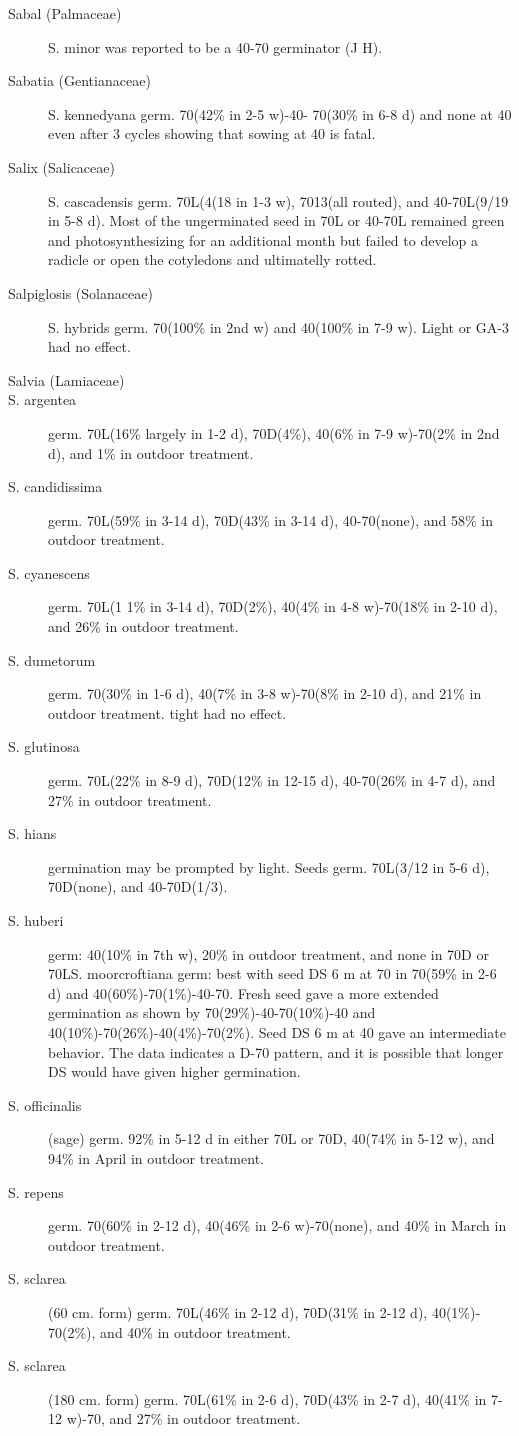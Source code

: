 \begin{description}
\item[Sabal (Palmaceae)] S. minor was reported to be a 40-70 germinator (J H).
\item[Sabatia (Gentianaceae)] S. kennedyana germ. 70(42\% in 2-5 w)-40-
70(30\% in 6-8 d) and none at 40 even after 3 cycles showing that sowing at 40 is fatal.
\item[Salix (Salicaceae)] S. cascadensis germ. 70L(4(18 in 1-3 w), 7013(all
routed), and 40-70L(9/19 in 5-8 d). Most of the ungerminated seed in 70L or 40-70L
remained green and photosynthesizing for an additional month but failed to develop a
radicle or open the cotyledons and ultimatelly rotted.
\item[Salpiglosis (Solanaceae)] S. hybrids germ. 70(100\% in 2nd w) and
40(100\% in 7-9 w). Light or GA-3 had no effect.

\item[Salvia (Lamiaceae)]
\item[S. argentea] germ. 70L(16\% largely in 1-2 d), 70D(4\%), 40(6\% in 7-9 w)-70(2\%
in 2nd d), and 1\% in outdoor treatment.
\item[S. candidissima] germ. 70L(59\% in 3-14 d), 70D(43\% in 3-14 d), 40-70(none),
and 58\% in outdoor treatment.
\item[S. cyanescens] germ. 70L(1 1\% in 3-14 d), 70D(2\%), 40(4\% in 4-8 w)-70(18\% in
2-10 d), and 26\% in outdoor treatment.
\item[S. dumetorum] germ. 70(30\% in 1-6 d), 40(7\% in 3-8 w)-70(8\% in 2-10 d), and
21\% in outdoor treatment. tight had no effect.
\item[S. glutinosa] germ. 70L(22\% in 8-9 d), 70D(12\% in 12-15 d), 40-70(26\% in 4-7
d), and 27\% in outdoor treatment.
\item[S. hians] germination may be prompted by light. Seeds germ. 70L(3/12 in 5-6
d), 70D(none), and 40-70D(1/3).
\item[S. huberi] germ: 40(10\% in 7th w), 20\% in outdoor treatment, and none in 70D
or 70LS. moorcroftiana germ: best with seed DS 6 m at 70 in 70(59\% in 2-6 d) and
40(60\%)-70(1\%)-40-70. Fresh seed gave a more extended germination as shown by
70(29\%)-40-70(10\%)-40 and 40(10\%)-70(26\%)-40(4\%)-70(2\%). Seed DS 6 m at 40
gave an intermediate behavior. The data indicates a D-70 pattern, and it is possible
that longer DS would have given higher germination.
\item[S. officinalis] (sage) germ. 92\% in 5-12 d in either 70L or 70D, 40(74\% in 5-12
w), and 94\% in April in outdoor treatment.
\item[S. repens] germ. 70(60\% in 2-12 d), 40(46\% in 2-6 w)-70(none), and 40\% in
March in outdoor treatment.
\item[S. sclarea] (60 cm. form) germ. 70L(46\% in 2-12 d), 70D(31\% in 2-12 d), 40(1\%)-
70(2\%), and 40\% in outdoor treatment.
\item[S. sclarea] (180 cm. form) germ. 70L(61\% in 2-6 d), 70D(43\% in 2-7 d), 40(41\%
in 7-12 w)-70, and 27\% in outdoor treatment.


\end{description}
